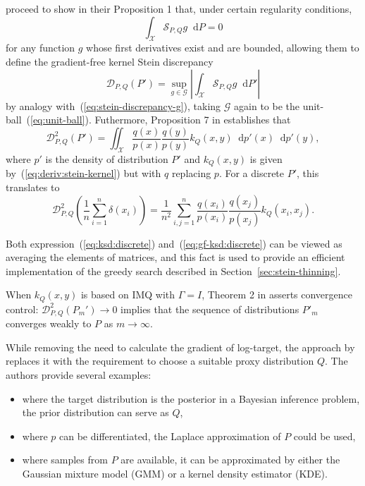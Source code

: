 \documentclass[11pt,a4paper]{report}
\newcommand*\diff{\mathop{}\!\mathrm{d}}
\begin{document}
\cite{fisherGradientFreeKernelStein2024} proceed to show in their Proposition 1 that, under certain regularity conditions,
\begin{equation*}
\int_\mathcal{X} \mathcal{S}_{P,Q} g \diff P = 0
\end{equation*}
for any function $g$ whose first derivatives exist and are bounded, allowing them to define the gradient-free kernel Stein discrepancy
\begin{equation*}
\mathcal{D}_{P, Q}(P') = \sup_{g \in \mathcal{G}}\left|\int_\mathcal{X} \mathcal{S}_{P,Q} g \diff P' \right|
\end{equation*}
by analogy with~(\ref{eq:stein-discrepancy-g}), taking $\mathcal{G}$ again to be the unit-ball~(\ref{eq:unit-ball}). Futhermore, Proposition 7 in \cite{fisherGradientFreeKernelStein2024} establishes that
\begin{equation*}
\mathcal{D}_{P, Q}^2(P') = \iint_\mathcal{X} \frac{q(x)}{p(x)} \frac{q(y)}{p(y)} k_Q(x, y) \diff p'(x) \diff p'(y),
\label{eq:gf-ksd:int}
\end{equation*}
where $p'$ is the density of distribution $P'$ and $k_Q(x, y)$ is given by~(\ref{eq:deriv:stein-kernel}) but with $q$ replacing $p$. For a discrete $P'$, this translates to
\begin{equation}
\mathcal{D}_{P, Q}^2\left(\frac{1}{n} \sum_{i=1}^n \delta(x_i)\right) = \frac{1}{n^2} \sum_{i,j=1}^n \frac{q(x_i)}{p(x_i)} \frac{q(x_j)}{p(x_j)} k_Q(x_i, x_j).
\label{eq:gf-ksd:discrete}
\end{equation}

Both expression~(\ref{eq:ksd:discrete}) and~(\ref{eq:gf-ksd:discrete}) can be viewed as averaging the elements of matrices, and this fact is used to provide an efficient implementation of the greedy search described in Section~\ref{sec:stein-thinning}.

When $k_Q(x,y)$ is based on IMQ with $\Gamma = I$, Theorem 2 in \cite{fisherGradientFreeKernelStein2024} asserts convergence control: $\mathcal{D}_{P, Q}^2(P_m') \to 0$ implies that the sequence of distributions $P'_m$ converges weakly to $P$ as $m \to \infty$. 

While removing the need to calculate the gradient of log-target, the approach by \cite{fisherGradientFreeKernelStein2024} replaces it with the requirement to choose a suitable proxy distribution $Q$. The authors provide several examples:
\begin{itemize}
\item where the target distribution is the posterior in a Bayesian inference problem, the prior distribution can serve as $Q$,
\item where $p$ can be differentiated, the Laplace approximation of $P$ could be used,
\item where samples from $P$ are available, it can be approximated by either the Gaussian mixture model (GMM) or a kernel density estimator (KDE).
\end{itemize}
\end{document}
